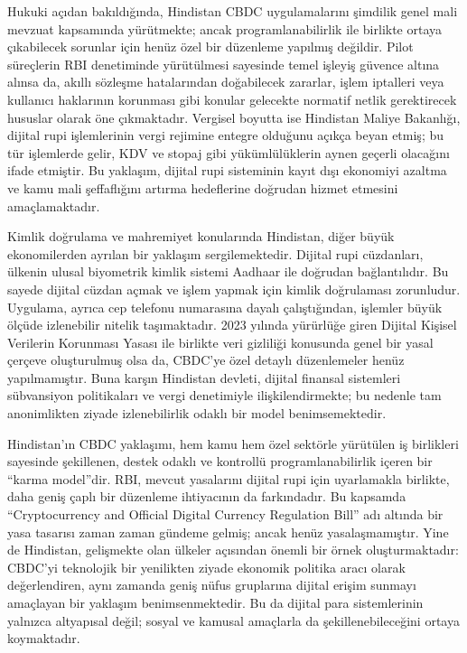 \documentclass[a4paper,12pt]{article}
\begin{document}
Hukuki açıdan bakıldığında, Hindistan CBDC uygulamalarını şimdilik genel mali mevzuat kapsamında yürütmekte; ancak programlanabilirlik ile birlikte ortaya çıkabilecek sorunlar için henüz özel bir düzenleme yapılmış değildir. Pilot süreçlerin RBI denetiminde yürütülmesi sayesinde temel işleyiş güvence altına alınsa da, akıllı sözleşme hatalarından doğabilecek zararlar, işlem iptalleri veya kullanıcı haklarının korunması gibi konular gelecekte normatif netlik gerektirecek hususlar olarak öne çıkmaktadır. Vergisel boyutta ise Hindistan Maliye Bakanlığı, dijital rupi işlemlerinin vergi rejimine entegre olduğunu açıkça beyan etmiş; bu tür işlemlerde gelir, KDV ve stopaj gibi yükümlülüklerin aynen geçerli olacağını ifade etmiştir. Bu yaklaşım, dijital rupi sisteminin kayıt dışı ekonomiyi azaltma ve kamu mali şeffaflığını artırma hedeflerine doğrudan hizmet etmesini amaçlamaktadır.

Kimlik doğrulama ve mahremiyet konularında Hindistan, diğer büyük ekonomilerden ayrılan bir yaklaşım sergilemektedir. Dijital rupi cüzdanları, ülkenin ulusal biyometrik kimlik sistemi Aadhaar ile doğrudan bağlantılıdır. Bu sayede dijital cüzdan açmak ve işlem yapmak için kimlik doğrulaması zorunludur. Uygulama, ayrıca cep telefonu numarasına dayalı çalıştığından, işlemler büyük ölçüde izlenebilir nitelik taşımaktadır. 2023 yılında yürürlüğe giren Dijital Kişisel Verilerin Korunması Yasası ile birlikte veri gizliliği konusunda genel bir yasal çerçeve oluşturulmuş olsa da, CBDC’ye özel detaylı düzenlemeler henüz yapılmamıştır. Buna karşın Hindistan devleti, dijital finansal sistemleri sübvansiyon politikaları ve vergi denetimiyle ilişkilendirmekte; bu nedenle tam anonimlikten ziyade izlenebilirlik odaklı bir model benimsemektedir.

Hindistan’ın CBDC yaklaşımı, hem kamu hem özel sektörle yürütülen iş birlikleri sayesinde şekillenen, destek odaklı ve kontrollü programlanabilirlik içeren bir “karma model”dir. RBI, mevcut yasalarını dijital rupi için uyarlamakla birlikte, daha geniş çaplı bir düzenleme ihtiyacının da farkındadır. Bu kapsamda “Cryptocurrency and Official Digital Currency Regulation Bill” adı altında bir yasa tasarısı zaman zaman gündeme gelmiş; ancak henüz yasalaşmamıştır. Yine de Hindistan, gelişmekte olan ülkeler açısından önemli bir örnek oluşturmaktadır: CBDC’yi teknolojik bir yenilikten ziyade ekonomik politika aracı olarak değerlendiren, aynı zamanda geniş nüfus gruplarına dijital erişim sunmayı amaçlayan bir yaklaşım benimsenmektedir. Bu da dijital para sistemlerinin yalnızca altyapısal değil; sosyal ve kamusal amaçlarla da şekillenebileceğini ortaya koymaktadır.
\end{document}
